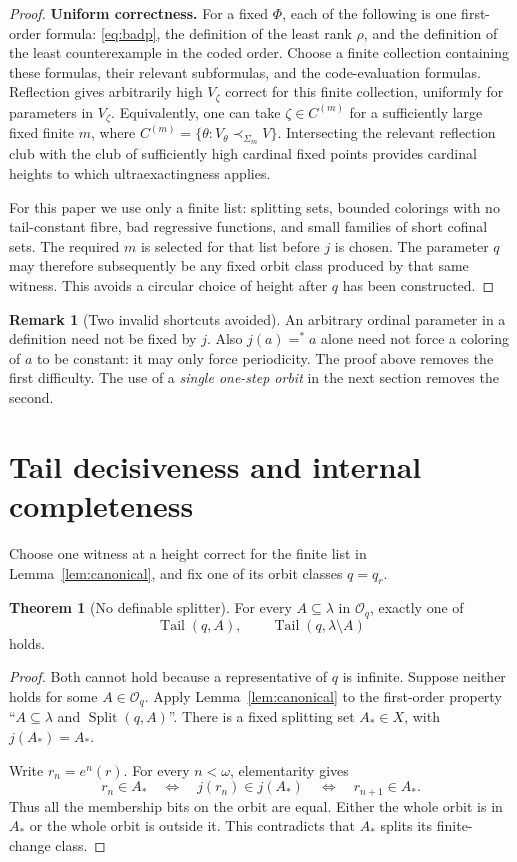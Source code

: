 \documentclass[11pt,letterpaper]{article}
\theoremstyle{definition}
\newtheorem{theorem}[definition]{Theorem}
\newtheorem{remark}[definition]{Remark}
\numberwithin{equation}{section}
\newcommand{\Tail}{\operatorname{Tail}}
\newcommand{\Split}{\operatorname{Split}}
\begin{document}
\begin{proof}
\textbf{Uniform correctness.}
For a fixed $\Phi$, each of the following is one first-order formula: \eqref{eq:badp}, the definition of the least rank $\rho$, and the definition of the least counterexample in the coded order. Choose a finite collection containing these formulas, their relevant subformulas, and the code-evaluation formulas. Reflection gives arbitrarily high $V_\zeta$ correct for this finite collection, uniformly for parameters in $V_\zeta$. Equivalently, one can take $\zeta\in C^{(m)}$ for a sufficiently large fixed finite $m$, where $C^{(m)}=\{\theta:V_\theta\prec_{\Sigma_m}V\}$. Intersecting the relevant reflection club with the club of sufficiently high cardinal fixed points provides cardinal heights to which ultraexactingness applies.

For this paper we use only a finite list: splitting sets, bounded colorings with no tail-constant fibre, bad regressive functions, and small families of short cofinal sets. The required $m$ is selected for that list before $j$ is chosen. The parameter $q$ may therefore subsequently be any fixed orbit class produced by that same witness. This avoids a circular choice of height after $q$ has been constructed.
\end{proof}

\begin{remark}[Two invalid shortcuts avoided]
An arbitrary ordinal parameter in a definition need not be fixed by $j$. Also $j(a)=^*a$ alone need not force a coloring of $a$ to be constant: it may only force periodicity. The proof above removes the first difficulty. The use of a \emph{single one-step orbit} in the next section removes the second.
\end{remark}

\section{Tail decisiveness and internal completeness}\label{sec:ultrafilters}

Choose one witness at a height correct for the finite list in Lemma~\ref{lem:canonical}, and fix one of its orbit classes $q=q_r$.

\begin{theorem}[No definable splitter]\label{thm:nosplit}
For every $A\subseteq\lambda$ in $\mathcal O_q$, exactly one of
\[
 \Tail(q,A),\qquad \Tail(q,\lambda\setminus A)
\]
holds.
\end{theorem}

\begin{proof}
Both cannot hold because a representative of $q$ is infinite. Suppose neither holds for some $A\in\mathcal O_q$. Apply Lemma~\ref{lem:canonical} to the first-order property ``$A\subseteq\lambda$ and $\Split(q,A)$''. There is a fixed splitting set $A_*\in X$, with $j(A_*)=A_*$.

Write $r_n=e^n(r)$. For every $n<\omega$, elementarity gives
\[
 r_n\in A_*
 \quad\Longleftrightarrow\quad j(r_n)\in j(A_*)
 \quad\Longleftrightarrow\quad r_{n+1}\in A_*.
\]
Thus all the membership bits on the orbit are equal. Either the whole orbit is in $A_*$ or the whole orbit is outside it. This contradicts that $A_*$ splits its finite-change class.
\end{proof}
\end{document}
